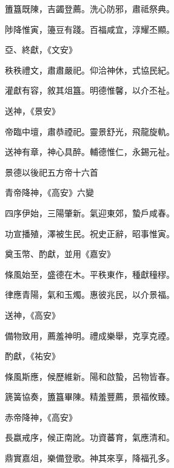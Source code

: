 \begin{pinyinscope}
 簠簋既陳，吉蠲登薦。洗心防邪，肅祗祭典。



 陟降惟寅，籩豆有踐。百福咸宜，淳耀丕顯。



 亞、終獻，《文安》



 秩秩禮文，肅肅嚴祀。仰洽神休，式協民紀。



 灌獻有容，敘其俎簋。明德惟馨，以介丕祉。



 送神，《景安》



 帝臨中壇，肅恭禋祀。靈景舒光，飛龍旋軌。



 送神有章，神心具醉。輔德惟仁，永錫元祉。



 景德以後祀五方帝十六首



 青帝降神，《高安》六變



 四序伊始，三陽肇新。氣迎東郊，蟄戶咸春。



 功宣播殖，澤被生民。祝史正辭，昭事惟寅。



 奠玉幣、酌獻，並用《嘉安》



 條風始至，盛德在木。平秩東作，種獻穜穋。



 律應青陽，氣和玉燭。惠彼兆民，以介景福。



 送神，《高安》



 備物致用，薦羞神明。禮成樂舉，克享克禋。



 酌獻，《祐安》



 條風斯應，候歷維新。陽和啟蟄，呂物皆春。



 篪簧協奏，簠簋畢陳。精羞豐薦，景福攸臻。



 赤帝降神，《高安》



 長嬴戒序，候正南訛。功資蕃育，氣應清和。



 鼎實嘉俎，樂備登歌。神其來享，降福孔多。




\end{pinyinscope}

